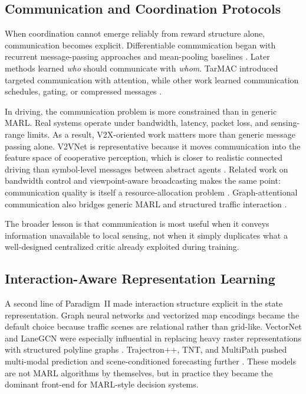 \documentclass[12pt, a4paper]{article}
\begin{document}
\subsection{Communication and Coordination Protocols}

When coordination cannot emerge reliably from reward structure alone,
communication becomes explicit. Differentiable communication began with recurrent
message-passing approaches and mean-pooling baselines \cite{foerster2016learning,sukhbaatar2016learning}. Later methods learned \emph{who} should communicate
with \emph{whom}. TarMAC introduced targeted communication with attention, while
other work learned communication schedules, gating, or compressed messages
\cite{das2019tarmac,jiang2018learning,singh2019learning,kim2019learning,kim2019message}.

In driving, the communication problem is more constrained than in generic MARL.
Real systems operate under bandwidth, latency, packet loss, and sensing-range
limits. As a result, V2X-oriented work matters more than generic message passing
alone. V2VNet is representative because it moves communication into the feature
space of cooperative perception, which is closer to realistic connected driving
than symbol-level messages between abstract agents \cite{wang2020v2vnet}. Related
work on bandwidth control and viewpoint-aware broadcasting makes the same point:
communication quality is itself a resource-allocation problem
\cite{wang2021vbc,wang2020bandwidth}. Graph-attentional communication also
bridges generic MARL and structured traffic interaction \cite{jiang2019graph,velickovic2018graph}.

The broader lesson is that communication is most useful when it conveys
information unavailable to local sensing, not when it simply duplicates what a
well-designed centralized critic already exploited during training.

\subsection{Interaction-Aware Representation Learning}

A second line of Paradigm~II made interaction structure explicit in the state
representation. Graph neural networks and vectorized map encodings became the
default choice because traffic scenes are relational rather than grid-like.
VectorNet and LaneGCN were especially influential in replacing heavy raster
representations with structured polyline graphs \cite{gao2020vectornet,liang2020lanegcn}. Trajectron++, TNT, and MultiPath pushed multi-modal prediction and
scene-conditioned forecasting further \cite{salzmann2020trajectron,zhao2020tnt,chai2019multipath}. These models are not MARL algorithms by themselves, but in
practice they became the dominant front-end for MARL-style decision systems.
\end{document}
